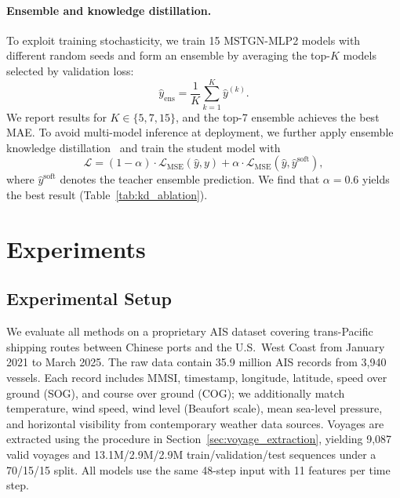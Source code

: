 \documentclass[sigconf,anonymous]{acmart}%
\begin{document}
\paragraph{Ensemble and knowledge distillation.}
To exploit training stochasticity, we train 15 MSTGN-MLP2 models with different random seeds and form an ensemble by averaging the top-$K$ models selected by validation loss:
\begin{equation}
    \hat{y}_{\text{ens}} = \frac{1}{K} \sum_{k=1}^{K} \hat{y}^{(k)}.
\end{equation}
We report results for $K \in \{5,7,15\}$, and the top-7 ensemble achieves the best MAE. To avoid multi-model inference at deployment, we further apply ensemble knowledge distillation~\cite{hinton2015distilling} and train the student model with
\begin{equation}
    \mathcal{L} = (1-\alpha)\cdot\mathcal{L}_{\text{MSE}}(\hat{y}, y) + \alpha\cdot\mathcal{L}_{\text{MSE}}(\hat{y}, \hat{y}^{\text{soft}}),
    \label{eq:kd_loss}
\end{equation}
where $\hat{y}^{\text{soft}}$ denotes the teacher ensemble prediction. We find that $\alpha = 0.6$ yields the best result (Table~\ref{tab:kd_ablation}).


\section{Experiments}

\subsection{Experimental Setup}

We evaluate all methods on a proprietary AIS dataset covering trans-Pacific shipping routes between Chinese ports and the U.S.\ West Coast from January 2021 to March 2025. The raw data contain 35.9 million AIS records from 3,940 vessels. Each record includes MMSI, timestamp, longitude, latitude, speed over ground (SOG), and course over ground (COG); we additionally match temperature, wind speed, wind level (Beaufort scale), mean sea-level pressure, and horizontal visibility from contemporary weather data sources. Voyages are extracted using the procedure in Section~\ref{sec:voyage_extraction}, yielding 9,087 valid voyages and 13.1M/2.9M/2.9M train/validation/test sequences under a 70/15/15 split. All models use the same 48-step input with 11 features per time step.
\end{document}
